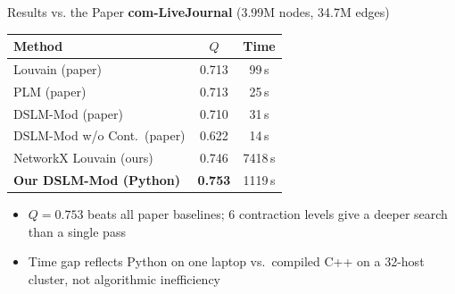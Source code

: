 \documentclass[aspectratio=169]{beamer}
\begin{document}
\begin{frame}{Results vs. the Paper}
  \textbf{com-LiveJournal} (3.99M nodes, 34.7M edges)

  \medskip
  \begin{center}
  \begin{tabular}{lcc}
    \toprule
    Method & $Q$ & Time \\
    \midrule
    Louvain (paper)              & 0.713 & 99\,s \\
    PLM (paper)                  & 0.713 & 25\,s \\
    DSLM-Mod (paper)             & 0.710 & 31\,s \\
    DSLM-Mod w/o Cont.\ (paper)  & 0.622 & 14\,s \\
    \midrule
    NetworkX Louvain (ours)      & 0.746 & 7418\,s \\
    \textbf{Our DSLM-Mod (Python)} & \textbf{0.753} & 1119\,s \\
    \bottomrule
  \end{tabular}
  \end{center}

  \medskip
  \begin{itemize}
    \item $Q = 0.753$ beats all paper baselines; 6 contraction levels give a deeper search than a single pass
    \item Time gap reflects Python on one laptop vs.\ compiled C++ on a 32-host cluster, not algorithmic inefficiency
  \end{itemize}
\end{frame}
\end{document}

